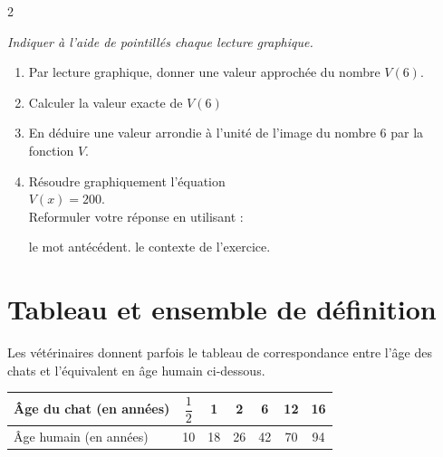 \documentclass[10pt,a4paper]{article}
\begin{document}
\begin{multicols}{2}
\begin{exo}
    \medbreak
    \textit{Indiquer à l'aide de pointillés chaque lecture graphique.}
    \begin{enumerate}
        \item Par lecture graphique, donner une valeur approchée du nombre \(V(6)\).
        \item Calculer la valeur exacte de \(V(6)\)
        \item En déduire une valeur arrondie à l'unité de l'image du nombre \(6\) par la fonction \(V\).
        \item Résoudre graphiquement l'équation \\ \(V(x)=200\).\\ Reformuler votre réponse en utilisant : 
        \begin{tasks}
            \task le mot antécédent.
            \task le contexte de l'exercice. 
        \end{tasks}
    \end{enumerate}

\end{exo}


\section{Tableau et ensemble de définition}

\begin{exo}
    Les vétérinaires donnent parfois le tableau de correspondance entre l'âge des chats et l'équivalent en âge humain ci-dessous.
    
    \begin{tabular}{|p{2cm}|*{6}{c|}}
        \hline
        Âge du chat (en années) & \(\dfrac{1}{2}\) & 1 & 2 & 6 & 12 & 16 \\ \hline
        Âge humain (en années) & 10 & 18 & 26 & 42 & 70 & 94 \\ \hline
    \end{tabular}


\end{exo}
\end{multicols}
\end{document}

